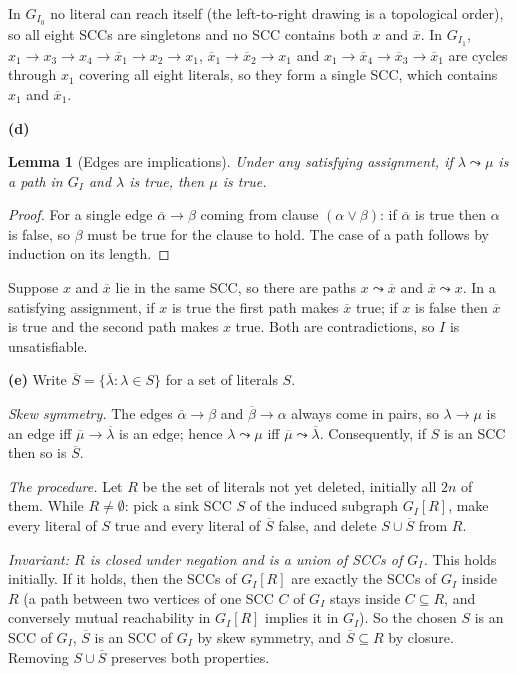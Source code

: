 \documentclass[11pt]{article}
\newcommand{\neglit}[1]{\overline{#1}}
\newtheorem*{lemma}{Lemma}
\theoremstyle{definition}
\begin{document}
In $G_{I_0}$ no literal can reach itself (the left-to-right drawing is a topological order), so all eight SCCs are
singletons and no SCC contains both $x$ and $\neglit x$. In $G_{I_1}$,
$x_1\to x_3\to x_4\to\neglit{x}_1\to x_2\to x_1$, $\neglit{x}_1\to\neglit{x}_2\to x_1$ and
$x_1\to\neglit{x}_4\to\neglit{x}_3\to\neglit{x}_1$ are cycles through $x_1$ covering all eight literals, so they
form a single SCC, which contains $x_1$ and $\neglit{x}_1$.

\textbf{(d)}
\begin{lemma}[Edges are implications]
Under any satisfying assignment, if $\lambda\leadsto\mu$ is a path in $G_I$ and $\lambda$ is true, then $\mu$ is
true.
\end{lemma}
\begin{proof}
For a single edge $\neglit\alpha\to\beta$ coming from clause $(\alpha\vee\beta)$: if $\neglit\alpha$ is true then
$\alpha$ is false, so $\beta$ must be true for the clause to hold. The case of a path follows by induction on its
length.
\end{proof}
Suppose $x$ and $\neglit x$ lie in the same SCC, so there are paths $x\leadsto\neglit x$ and
$\neglit x\leadsto x$. In a satisfying assignment, if $x$ is true the first path makes $\neglit x$ true; if $x$ is
false then $\neglit x$ is true and the second path makes $x$ true. Both are contradictions, so $I$ is
unsatisfiable.

\textbf{(e)} Write $\neglit S=\{\neglit\lambda:\lambda\in S\}$ for a set of literals $S$.

\emph{Skew symmetry.} The edges $\neglit\alpha\to\beta$ and $\neglit\beta\to\alpha$ always come in pairs, so
$\lambda\to\mu$ is an edge iff $\neglit\mu\to\neglit\lambda$ is an edge; hence $\lambda\leadsto\mu$ iff
$\neglit\mu\leadsto\neglit\lambda$. Consequently, if $S$ is an SCC then so is $\neglit S$.

\emph{The procedure.} Let $R$ be the set of literals not yet deleted, initially all $2n$ of them. While
$R\neq\emptyset$: pick a sink SCC $S$ of the induced subgraph $G_I[R]$, make every literal of $S$ true and every
literal of $\neglit S$ false, and delete $S\cup\neglit S$ from $R$.

\emph{Invariant: $R$ is closed under negation and is a union of SCCs of $G_I$.} This holds initially. If it holds,
then the SCCs of $G_I[R]$ are exactly the SCCs of $G_I$ inside $R$ (a path between two vertices of one SCC $C$ of
$G_I$ stays inside $C\subseteq R$, and conversely mutual reachability in $G_I[R]$ implies it in $G_I$). So the
chosen $S$ is an SCC of $G_I$, $\neglit S$ is an SCC of $G_I$ by skew symmetry, and $\neglit S\subseteq R$ by
closure. Removing $S\cup\neglit S$ preserves both properties.
\end{document}
